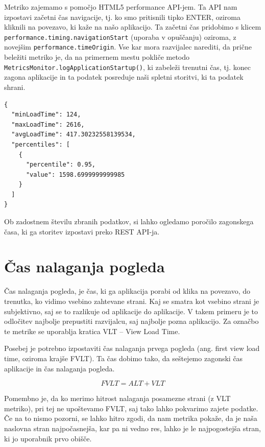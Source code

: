 \documentclass[a4paper, 12pt]{book}
\begin{document}
Metriko zajemamo s pomočjo HTML5 performance API-jem. Ta API nam izpostavi začetni čas navigacije, tj. ko smo pritisnili tipko ENTER, oziroma kliknili na povezavo, ki kaže na našo aplikacijo. Ta začetni čas pridobimo s klicem \verb|performance.timing.navigationStart| (uporaba v opuščanju) oziroma, z novejšim \verb|performance.timeOrigin|. Vse kar mora razvijalec narediti, da prične beležiti metriko je, da na primernem mestu pokliče metodo \\ \verb|MetricsMonitor.logApplicationStartup()|, ki zabeleži trenutni čas, tj. konec zagona aplikacije in ta podatek posreduje naši spletni storitvi, ki ta podatek shrani.

\begin{lstlisting}[label=code:app_startup_report, caption=Poročilo zagonskega časa aplikacije]
{
  "minLoadTime": 124,
  "maxLoadTime": 2616,
  "avgLoadTime": 417.30232558139534,
  "percentiles": [
    {
      "percentile": 0.95,
      "value": 1598.6999999999985
    }
  ]
}
\end{lstlisting}

Ob zadostnem številu zbranih podatkov, si lahko ogledamo poročilo zagonskega časa, ki ga storitev izpostavi preko REST API-ja.


\section{Čas nalaganja pogleda}
\label{ch2:sec2}

Čas nalaganja pogleda, je čas, ki ga aplikacija porabi od klika na povezavo, do trenutka, ko vidimo vsebino zahtevane strani. Kaj se smatra kot vsebino strani je subjektivno, saj se to razlikuje od aplikacije do aplikacije. V takem primeru je to odločitev najbolje prepustiti razvijalcu, saj najbolje pozna aplikacijo. Za označbo te metrike se uporablja kratica VLT – View Load Time.

Posebej je potrebno izpostaviti čas nalaganja prvega pogleda (ang. first view load time, oziroma krajše FVLT). Ta čas dobimo tako, da seštejemo zagonski čas aplikacije in čas nalaganja pogleda.

\begin{equation}
\label{eq:fvlt}
FVLT = ALT + VLT
\end{equation}

Pomembno je, da ko merimo hitrost nalaganja posamezne strani (z VLT metriko), pri tej ne upoštevamo FVLT, saj tako lahko pokvarimo zajete podatke. Če na to nismo pozorni, se lahko hitro zgodi, da nam metrika pokaže, da je naša naslovna stran najpočasnejša, kar pa ni vedno res, lahko je le najpogostejša stran, ki jo uporabnik prvo obišče.
\end{document}
